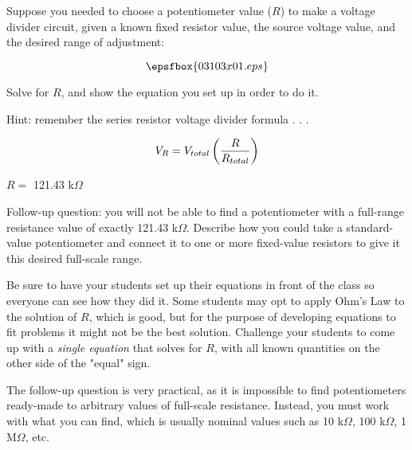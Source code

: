 

Suppose you needed to choose a potentiometer value ($R$) to make a voltage divider circuit, given a known fixed resistor value, the source voltage value, and the desired range of adjustment:

$$\epsfbox{03103x01.eps}$$

Solve for $R$, and show the equation you set up in order to do it.

\vskip 10pt

Hint: remember the series resistor voltage divider formula . . .

$$V_R = V_{total}\left( {R \over R_{total}} \right)$$







$R =$ 121.43 k$\Omega$

\vskip 10pt

Follow-up question: you will not be able to find a potentiometer with a full-range resistance value of exactly 121.43 k$\Omega$.  Describe how you could take a standard-value potentiometer and connect it to one or more fixed-value resistors to give it this desired full-scale range.







Be sure to have your students set up their equations in front of the class so everyone can see how they did it.  Some students may opt to apply Ohm's Law to the solution of $R$, which is good, but for the purpose of developing equations to fit problems it might not be the best solution.  Challenge your students to come up with a {\it single equation} that solves for $R$, with all known quantities on the other side of the "equal" sign.

The follow-up question is very practical, as it is impossible to find potentiometers ready-made to arbitrary values of full-scale resistance.  Instead, you must work with what you can find, which is usually nominal values such as 10 k$\Omega$, 100 k$\Omega$, 1 M$\Omega$, etc.




